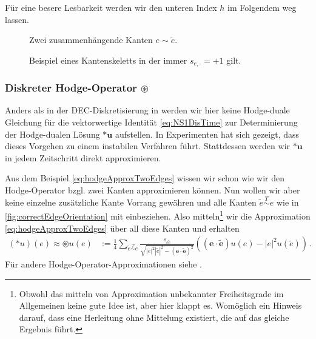 \documentclass[a4paper,11pt]{scrartcl}
\newcommand{\U}{u} %
\newcommand{\Ub}{\mathbf{\U}} %
\newcommand{\vect}[1]{\mathbf{#1}}
\newcommand{\face}{T} %
\newcommand{\facesim}{\overset{\face}{\sim}}
\newcommand{\formPeriod}{\,\text{.}}
\newcommand{\ingo}[1]{{\color{blue}#1}}
\begin{document}
      Für eine besere Lesbarkeit werden wir den unteren Index \( h \) im Folgendem weg lassen.

    \begin{figure}[tbp]
      \begin{minipage}[b]{0.45\textwidth}
        \center
        
        \caption{Zwei zusammenhängende Kanten \( e \sim \tilde{e} \).}
        \label{fig:oneVertexTwoEdges}
      \end{minipage}
      \hfill
      \begin{minipage}[b]{0.45\textwidth}
        \center
        
        \caption{Beispiel eines Kantenskeletts in der immer \( s_{e,\cdot} = +1\) gilt.}
        \label{fig:correctEdgeOrientation}
      \end{minipage}
    \end{figure}
    

  \subsubsection{Diskreter Hodge-Operator \( \circledast \)}
    Anders als in der DEC-Diskretisierung in \cite{Nestler2016} werden wir hier keine Hodge-duale Gleichung für die vektorwertige Identität \eqref{eq:NS1DisTime}
    zur Determinierung der Hodge-dualen Lösung \( *\Ub \) aufstellen.
    In Experimenten hat sich gezeigt, dass dieses Vorgehen zu einem instabilen Verfahren führt.
    Stattdessen werden wir \( *\Ub \) in jedem Zeitschritt direkt approximieren.

    
    Aus dem Beispiel \eqref{eq:hodgeApproxTwoEdges} wissen wir schon wie wir den Hodge-Operator bzgl. zwei Kanten approximieren können.
    Nun wollen wir aber keine einzelne zusätzliche Kante Vorrang gewähren und alle Kanten \( \tilde{e}\facesim e \) 
    wie in \autoref{fig:correctEdgeOrientation} mit einbeziehen.
    Also mitteln\footnote{\ingo{Obwohl das mitteln von Approximation unbekannter Freiheitsgrade im Allgemeinen keine gute Idee ist, aber hier klappt es.
                                Womöglich ein Hinweis darauf, dass eine Herleitung ohne Mittelung existiert, die auf das gleiche Ergebnis führt.}} 
    wir die Approximation \eqref{eq:hodgeApproxTwoEdges} über all diese Kanten und erhalten
    \begin{align}
      \left( *\U \right)(e) \approx \circledast \U (e)
            &:= \frac{1}{4}\sum_{\tilde{e}\facesim e}
                          \frac{s_{e\tilde{e}}}{\sqrt{\left| e \right|^{2}\left| \tilde{e} \right|^{2} 
                                                        - \left( \vect{e}\cdot\tilde{\vect{e}}\right)^{2}}}
                             \left( \left( \vect{e}\cdot\tilde{\vect{e}} \right) \U(e) 
                                   -\left| e \right|^{2}\U(\tilde{e}) \right) \formPeriod
    \end{align}
    Für andere Hodge-Operator-Approximationen siehe \cite{Mohamed2016}.
\end{document}
